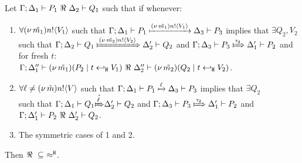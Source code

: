 \documentclass[runningheads]{llncs}
\begin{document}
{{\begin{lemma}%
	\label{lem:up_to_deterministic_transition}
	Let $\Gamma; \Delta_1 \vdash P_1 \ \Re\  \Delta_2 \vdash Q_1$ such
	that if whenever:
%
	\begin{enumerate}[1.]
		\item	$\forall (\nu\, \tilde{m_1}) n ! \langle V_1 \rangle$ such that
			$
				\Gamma; \Delta_1 \vdash P_1 \xmapsto{(\nu\, \tilde{m_1}) n !\langle V_1 \rangle} \Delta_3 \vdash P_3
			$
			implies that $\exists Q_2, V_2$ such that
			$
				\horel{\Gamma}{\Delta_2}{Q_1}{\Hby{\news{\tilde{m_2}} \bactout{n}{V_2}}}{\Delta_2'}{Q_2}
			$
			and
			$
				\horel{\Gamma}{\Delta_3}{P_3}{\Hby{\dtau}}{\Delta_1'}{P_2}
			$
			and for fresh $t$:\\
			$
				\Gamma; \Delta_1'' \vdash (\nu\, \tilde{m_1})(P_2 \;|\; t \hookleftarrow_{\mathtt{H}} V_1) \ \Re\  \Delta_2'' \vdash{(\nu\, \tilde{m_2})(Q_2 \;|\;t \hookleftarrow_{\mathtt{H}} V_2)}
			$.
%
		\item	$\forall \ell \not= (\nu\, \tilde{m}) n ! \langle V \rangle$ such that
			$
				\Gamma; \Delta_1 \vdash P_1 \xmapsto{\ell} \Delta_3 \vdash P_3
			$
			implies that $\exists Q_2$  \\ such that 
			$
				\horel{\Gamma}{\Delta_1}{Q_1}{\hat{\Hby{\ell}}}{\Delta_2'}{Q_2}
			$
			and
			$
				\horel{\Gamma}{\Delta_3}{P_3}{\Hby{\dtau}}{\Delta_1'}{P_2}
			$
			and
			$\Gamma; \Delta_1' \vdash P_2 \ \Re\  \Delta_2' \vdash Q_2$.

		\item	The symmetric cases of 1 and 2.
	\end{enumerate}
	Then $\Re\ \subseteq\ \approx^\mathtt{H}$.
\end{lemma}



}}
\end{document}
